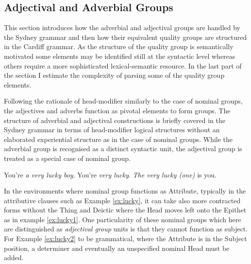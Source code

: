 \subsection{Adjectival and Adverbial Groups}
	\label{sec:advectival-adverbial-groups}

    This section introduces how the adverbial and adjectival groups are handled by the Sydney grammar and then how their equivalent quality groups are structured in the Cardiff grammar. As the structure of the quality group is semantically motivated some elements may be identified still at the syntactic level whereas others require a more sophisticated lexical-semantic resource. In the last part of the section I estimate the complexity of parsing some of the quality group elements.

	Following the rationale of head-modifier similarly to the case of nominal groups, the adjectives and adverbs function as pivotal elements to form groups. The structure of adverbial and adjectival constructions is briefly covered in the Sydney grammar in terms of head-modifier logical structures without an elaborated experiential structure as in the case of nominal groups. While the adverbial group is recognised as a distinct syntactic unit, the adjectival group is treated as a special case of nominal group. %
	
	\begin{exe}
		\ex\label{ex:lucky} You're \textit{a very lucky boy}.
        \ex\label{ex:lucky1} You're \textit{very lucky}.
        \ex\label{ex:lucky2} \textit{The very lucky (one)} is you.
	\end{exe}
	
    

    In the environments where nominal group functions as Attribute, typically in the attributive clauses such as Example \ref{ex:lucky}, it can take also more contracted forms without the Thing and Deictic where the Head moves left onto the Epithet as in example \ref{ex:lucky1}. One particularity of these nominal groups which here are distinguished as \textit{adjectival group} units is that they cannot function as subject. For Example \ref{ex:lucky2} to be grammatical, where the Attribute is in the Subject position, a determiner and eventually an unspecified nominal Head must be added. 

